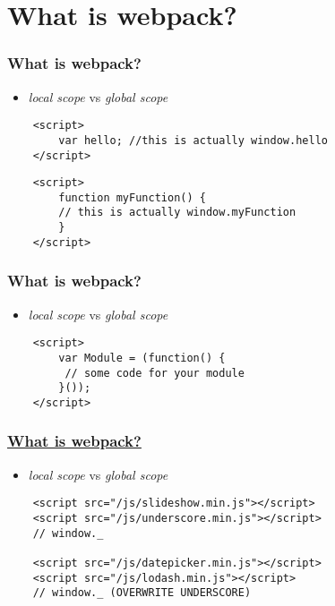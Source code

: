 \section{What is webpack?}

\frame{\tableofcontents[currentsection]}

\begin{frame}[fragile]
    \frametitle{What is webpack?}
    \begin{itemize}
        \item \textit{local scope} vs \textit{global scope}
    \end{itemize}
    \begin{verbatim}
    <script>
        var hello; //this is actually window.hello
    </script>
    \end{verbatim}
        \begin{verbatim}
    <script>
        function myFunction() { 
        // this is actually window.myFunction
        }
    </script>
    \end{verbatim}
\end{frame}

\begin{frame}[fragile]
    \frametitle{What is webpack?}
    \begin{itemize}
        \item \textit{local scope} vs \textit{global scope}
    \end{itemize}
        \begin{verbatim}
    <script>﻿
        var Module = (function() {
         // some code for your module
        }());
    </script>﻿
    \end{verbatim}
\end{frame}

\begin{frame}[fragile]
    \frametitle{\href{https://blog.jakoblind.no/whats-the-advantage-with-webpack/}{What is webpack?}}
    \begin{itemize}
        \item \textit{local scope} vs \textit{global scope}
    \end{itemize}
    \begin{verbatim}
    <script src="/js/slideshow.min.js"></script>
    <script src="/js/underscore.min.js"></script>
    // window._
        
    <script src="/js/datepicker.min.js"></script>
    <script src="/js/lodash.min.js"></script> 
    // window._ (OVERWRITE UNDERSCORE)
    \end{verbatim}
\end{frame}

